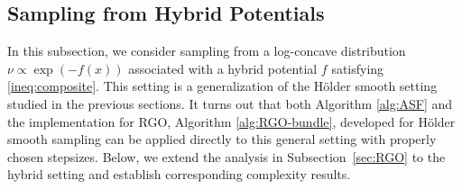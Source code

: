 \documentclass[11pt,letterpaper]{article}
\newcommand{\R}{\mathbb{R}}
\begin{document}


\subsection{Sampling from Hybrid Potentials}\label{sec:composite}
In this subsection, we consider sampling from a log-concave distribution $\nu\propto\exp(-f(x))$ associated with a hybrid potential $f$ satisfying \eqref{ineq:composite}. This setting is a generalization of the Hölder smooth setting studied in the previous sections. It turns out that both Algorithm \ref{alg:ASF} and the implementation for RGO, Algorithm \ref{alg:RGO-bundle}, developed for Hölder smooth sampling can be applied directly to this general setting with properly chosen stepsizes.
Below, we extend the analysis in Subsection~\ref{sec:RGO} to the hybrid setting and establish corresponding complexity results.



\end{document}
